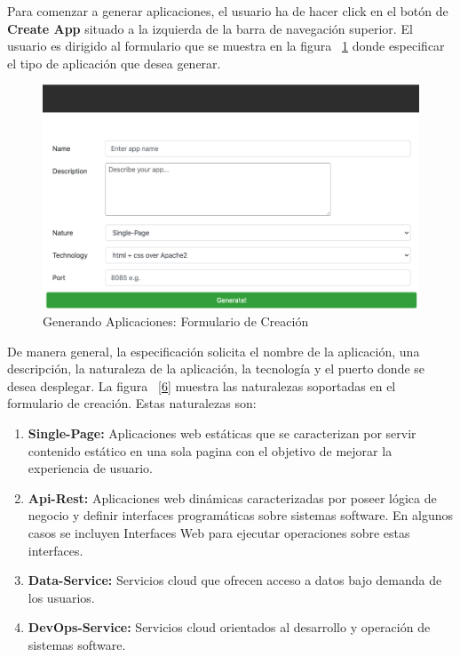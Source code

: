 \documentclass[a4paper,11pt]{book}
\begin{document}
Para comenzar a generar aplicaciones, el usuario ha de hacer click en el botón de \textbf{Create App} situado a la izquierda de la barra de navegación superior. El usuario es dirigido al formulario que se muestra en la figura   ~\ref{5}  donde especificar el tipo de aplicación que desea generar. 

\begin{figure}[H]
\centering
\includegraphics[scale=0.45]{imagenes/casouso_a/5.png}
\caption{ Generando Aplicaciones: Formulario de Creación  }
\label{5}
\end{figure}

De manera general, la especificación solicita el nombre de la aplicación, una descripción, la naturaleza de la aplicación, la tecnología y el puerto donde se desea desplegar. La figura ~\ref{6} muestra las naturalezas soportadas en el formulario de creación. Estas naturalezas son:

\begin{enumerate}
\item \textbf{ Single-Page: } Aplicaciones web estáticas que se caracterizan por servir contenido estático en una sola pagina con el objetivo de mejorar la experiencia de usuario. 
\item \textbf{ Api-Rest: } Aplicaciones web dinámicas caracterizadas por poseer lógica de negocio y definir interfaces programáticas sobre sistemas software. En algunos casos se incluyen Interfaces Web para ejecutar operaciones sobre estas interfaces.  
\item \textbf{ Data-Service:} Servicios cloud que ofrecen acceso a datos bajo demanda de los usuarios. 
\item \textbf{ DevOps-Service: } Servicios cloud orientados al desarrollo y operación de sistemas software. 
\end{enumerate}
\vspace{0.5cm}
\end{document}
